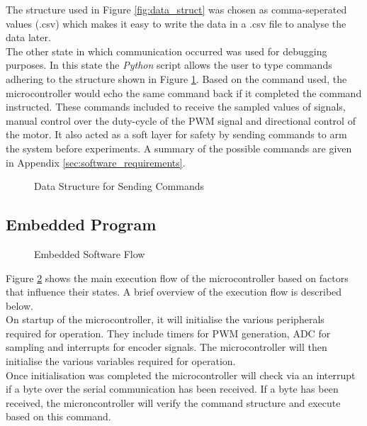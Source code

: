 The structure used in Figure \ref{fig:data_struct} was chosen as comma-seperated values (.csv) which makes it easy to write the data in a .csv file to analyse the data later.\\

The other state in which communication occurred was used for debugging purposes. In this state the \textit{Python} script allows the user to type commands adhering to the structure shown in Figure \ref{fig:uart_struct}. Based on the command used, the microcontroller would echo the same command back if it completed the command instructed. These commands included to receive the sampled values of signals, manual control over the duty-cycle of the PWM signal and directional control of the motor. It also acted as a soft layer for safety by sending commands to arm the system before experiments. A summary of the possible commands are given in Appendix \ref{sec:software_requirements}.


\begin{figure}[h]
	\centering
	
	\caption{Data Structure for Sending Commands}
	\label{fig:uart_struct}
\end{figure}


\subsection{Embedded Program}

\begin{figure}[h]
\centering

\caption{Embedded Software Flow}
\label{fig:software_flow}
\end{figure}


Figure \ref{fig:software_flow} shows the main execution flow of the microcontroller based on factors that influence their states. A brief overview of the execution flow is described below.\\

On startup of the microcontroller, it will initialise the various peripherals required for operation. They include timers for PWM generation, ADC for sampling and interrupts for encoder signals. The microcontroller will then initialise the various variables required for operation.\\

Once initialisation was completed the microcontroller will check via an interrupt if a byte over the serial communication has been received. If a byte has been received, the microncontroller will verify the command structure and execute based on this command.\\

